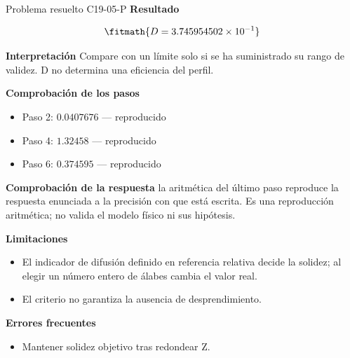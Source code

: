 \documentclass[10pt,openany]{book}
\begin{document}
\begin{studiumworked}{Problema resuelto C19-05-P}
\noindent\textbf{Resultado}

\[
\fitmath{D=3.745954502\times10^{-1}}
\]

\noindent\textbf{Interpretación}
Compare con un límite solo si se ha suministrado su rango de validez. D no determina una eficiencia del perfil.

\noindent\textbf{Comprobación de los pasos}
\begin{itemize}
\item Paso 2: $0.0407676$ — reproducido
\item Paso 4: $1.32458$ — reproducido
\item Paso 6: $0.374595$ — reproducido
\end{itemize}

\noindent\textbf{Comprobación de la respuesta} la aritmética del último paso reproduce la respuesta enunciada a la precisión con que está escrita. Es una reproducción aritmética; no valida el modelo físico ni sus hipótesis.

\noindent\textbf{Limitaciones}
\begin{itemize}
\item El indicador de difusión definido en referencia relativa decide la solidez; al elegir un número entero de álabes cambia el valor real.
\item El criterio no garantiza la ausencia de desprendimiento.
\end{itemize}

\noindent\textbf{Errores frecuentes}
\begin{itemize}
\item Mantener solidez objetivo tras redondear Z.
\end{itemize}
\begin{center}\end{center}
\end{studiumworked}
\end{document}
